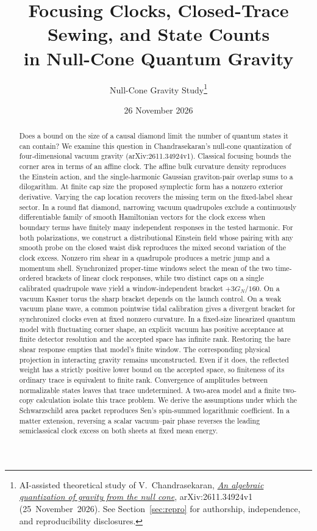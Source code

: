 \documentclass[10pt,a4paper]{article}
\title{\Large\bfseries Focusing Clocks, Closed-Trace Sewing, and State Counts\\in Null-Cone Quantum Gravity}
\author{Null-Cone Gravity Study\thanks{AI-assisted theoretical study of V.~Chandrasekaran, \href{https://arxiv.org/abs/2611.34924v1}{\emph{An algebraic quantization of gravity from the null cone}}, arXiv:2611.34924v1 (25~November~2026). See Section~\ref{sec:repro} for authorship, independence, and reproducibility disclosures.}}
\date{26 November 2026}
\numberwithin{equation}{section}
\begin{document}
\maketitle

\begin{abstract}
Does a bound on the size of a causal diamond limit the number of quantum states it can contain? We examine this question in Chandrasekaran's null-cone quantization of four-dimensional vacuum gravity (arXiv:2611.34924v1). Classical focusing bounds the corner area in terms of an affine clock. The affine bulk curvature density reproduces the Einstein action, and the single-harmonic Gaussian graviton-pair overlap sums to a dilogarithm. At finite cap size the proposed symplectic form has a nonzero exterior derivative. Varying the cap location recovers the missing term on the fixed-label shear sector. In a round flat diamond, narrowing vacuum quadrupoles exclude a continuously differentiable family of smooth Hamiltonian vectors for the clock excess when boundary terms have finitely many independent responses in the tested harmonic. For both polarizations, we construct a distributional Einstein field whose pairing with any smooth probe on the closed waist disk reproduces the mixed second variation of the clock excess. Nonzero rim shear in a quadrupole produces a metric jump and a momentum shell. Synchronized proper-time windows select the mean of the two time-ordered brackets of linear clock responses, while two distinct caps on a single calibrated quadrupole wave yield a window-independent bracket $+3G_N/160$. On a vacuum Kasner torus the sharp bracket depends on the launch control. On a weak vacuum plane wave, a common pointwise tidal calibration gives a divergent bracket for synchronized clocks even at fixed nonzero curvature. In a fixed-size linearized quantum model with fluctuating corner shape, an explicit vacuum has positive acceptance at finite detector resolution and the accepted space has infinite rank. Restoring the bare shear response empties that model's finite window. The corresponding physical projection in interacting gravity remains unconstructed. Even if it does, the reflected weight has a strictly positive lower bound on the accepted space, so finiteness of its ordinary trace is equivalent to finite rank. Convergence of amplitudes between normalizable states leaves that trace undetermined. A two-area model and a finite two-copy calculation isolate this trace problem. We derive the assumptions under which the Schwarzschild area packet reproduces Sen's spin-summed logarithmic coefficient. In a matter extension, reversing a scalar vacuum--pair phase reverses the leading semiclassical clock excess on both sheets at fixed mean energy.
\end{abstract}
\end{document}
